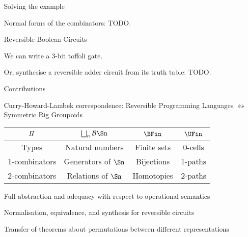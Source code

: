 \documentclass[aspectratio=169,9pt]{beamer}
\begin{document}
\begin{frame}[fragile]{Solving the example}

  Normal forms of the combinators:
  TODO.

\end{frame}

\begin{frame}[fragile]{Reversible Boolean Circuits}

  We can write a 3-bit toffoli gate.

  \medskip

  \controlled{}
  \cnot{}
  \toffolithree{}

  Or, synthesise a reversible adder circuit from its truth table:
  TODO.
\end{frame}

\begin{frame}[fragile]{Contributions}
  \begin{plist}
    \item Curry-Howard-Lambek correspondence:
    Reversible Programming Languages $\leftrightsquigarrow$ Symmetric Rig Groupoids
    \medskip
    \begin{table}
      \begin{center}
        \begin{tabular}{cccc}
          \hline
          $\mathit{\Pi}$     & $\bigsqcup_n \mathcal{B}\Sn $ & $\BFin$     & $\UFin$ \tabularnewline
          \hline\hline
          Types         & Natural numbers               & Finite sets & 0-cells \tabularnewline
          1-combinators & Generators of $\Sn$           & Bijections  & 1-paths \tabularnewline
          2-combinators & Relations of $\Sn$            & Homotopies  & 2-paths \tabularnewline
          \hline
        \end{tabular}
      \end{center}
      \label{fig:table-summary}
    \end{table}
    \medskip
    \item Full-abstraction and adequacy with respect to operational semantics
    \item Normalisation, equivalence, and synthesis for reversible circuits
    \item Transfer of theorems about permutations between different representations
  \end{plist}
\end{frame}
\end{document}
